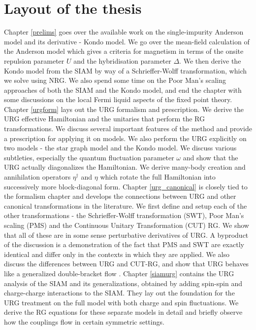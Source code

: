 \documentclass[12pt,twoside]{report}
\numberwithin{equation}{section}
\begin{document}
\section{Layout of the thesis}
Chapter \ref{prelims} goes over the available work on the single-impurity Anderson model and its derivative - Kondo model. We go over the mean-field calculation of the Anderson model which gives a criteria for magnetism in terms of the onsite repulsion parameter \(U\) and the hybridisation parameter \(\Delta\). We then derive the Kondo model from the SIAM by way of a Schrieffer-Wolff transformation, which we solve using NRG. We also spend some time on the Poor Man's scaling approaches of both the SIAM and the Kondo model, and end the chapter with some discussions on the local Fermi liquid aspects of the fixed point theory.
\pb Chapter \ref{urgform} lays out the URG formalism and prescription. We derive the URG effective Hamiltonian and the unitaries that perform the RG transformations. We discuss several important features of the method and provide a prescription for applying it on models. We also perform the URG explicitly on two models - the star graph model and the Kondo model. We discuss various subtleties, especially the quantum fluctuation parameter \(\omega\) and show that the URG actually diagonalizes the Hamiltonian. We derive many-body creation and annihilation operators \(\eta^\dagger\) and \(\eta\) which rotate the full Hamiltonian into successively more block-diagonal form.
\pb Chapter \ref{urg_canonical} is closely tied to the formalism chapter and develops the connections between URG and other canonical transformations in the literature. We first define and setup each of the other transformations - the Schrieffer-Wolff transformation (SWT), Poor Man's scaling (PMS) and the Continuous Unitary Transformation (CUT) RG. We show that all of these are in some sense perturbative derivatives of URG. A byproduct of the discussion is a demonstration of the fact that PMS and SWT are exactly identical and differ only in the contexts in which they are applied. We also discuss the differences between URG and CUT-RG, and show that URG behaves like a generalized double-bracket flow \cite{Brockett1991}.
\pb Chapter \ref{siamurg} contains the URG analysis of the SIAM and its generalizations, obtained by adding spin-spin and charge-charge interactions to the SIAM. They lay out the foundation for the URG treatment on the full model with both charge and spin fluctuations. We derive the RG equations for these separate models in detail and briefly observe how the couplings flow in certain symmetric settings. 
\end{document}
